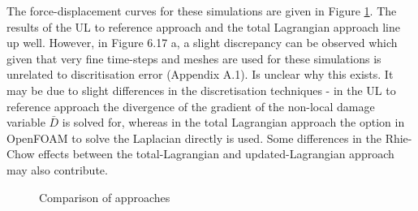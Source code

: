 \documentclass[sn-mathphys,Numbered,draft]{sn-jnl}%
\begin{document}
The force-displacement curves for these simulations are given in Figure \ref{UpdatedToReferenceComaprison}. The results of the UL to reference approach and the total Lagrangian approach line up well. However, in Figure 6.17 a, a slight discrepancy can be observed which given that very fine time-steps and meshes are used for these simulations is unrelated to discritisation error (Appendix A.1). Is unclear why this exists. It may be due to slight differences in the discretisation techniques - in the UL to reference approach the divergence of the gradient of the non-local damage variable $\bar{D}$ is solved for, whereas in the total Lagrangian approach the option in OpenFOAM to solve the Laplacian directly is used. Some differences in the Rhie-Chow effects between the total-Lagrangian and updated-Lagrangian approach may also contribute.

\begin{figure}[htbp]
	\centering
		
		
		\caption{Comparison of approaches}
	\label{UpdatedToReferenceComaprison}
\end{figure}
\FloatBarrier
\end{document}
